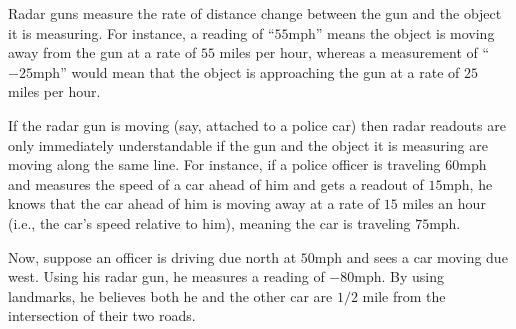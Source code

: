 \documentclass{ximera}
\author{Gregory Hartman \and Matthew Carr}
\begin{document}
\begin{exercise}



Radar guns measure the rate of distance change between the gun and the object it is measuring. For instance, a reading of ``$55$mph'' means the object is moving away from the gun at a rate of $55$ miles per hour, whereas a measurement of ``$-25$mph'' would mean that the object is approaching the gun at a rate of $25$ miles per hour.

If the radar gun is moving (say, attached to a police car) then radar readouts are only immediately understandable if the gun and the object it is measuring are moving along the same line. For instance, if a police officer is traveling $60$mph and measures the speed of a car ahead of him and gets a readout of $15$mph, he knows that the car ahead of him is moving away at a rate of $15$ miles an hour (i.e., the car's speed relative to him), meaning the car is traveling $75$mph.


Now, suppose an officer is driving due north at $50$mph and sees a car moving due west. Using his radar gun, he measures a reading of $-80$mph. By using landmarks, he believes both he and the other car are $1/2$ mile from the intersection of their two roads.


\end{exercise}
\end{document}
